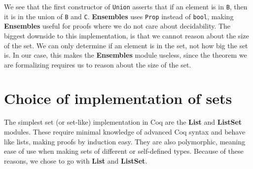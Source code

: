 We see that the first constructor of \lstinline{Union} asserts that if an element is in \lstinline{B},
then it is in the union of \lstinline{B} and \lstinline{C}.
\textbf{Ensembles} uses \lstinline{Prop} instead of \lstinline{bool},
making \textbf{Ensembles} useful for proofs where we do not care about decidability.
The biggest downside to this implementation, is that we cannot reason about the size of the set.
We can only determine if an element is in the set, not how big the set is.
In our case, this makes the \textbf{Ensembles} module useless, since the theorem we are formalizing requires us to reason about the
size of the set.

\section{Choice of implementation of sets}
\label{sec:choice_of_implementation_of_sets}

The simplest set (or set-like) implementation in Coq are the \textbf{List} and \textbf{ListSet} modules.
These require minimal knowledge of advanced Coq syntax and behave like lists, making proofs by induction easy.
They are also polymorphic, meaning ease of use when making sets of different or self-defined types.
Because of these reasons, we chose to go with \textbf{List} and \textbf{ListSet}.
